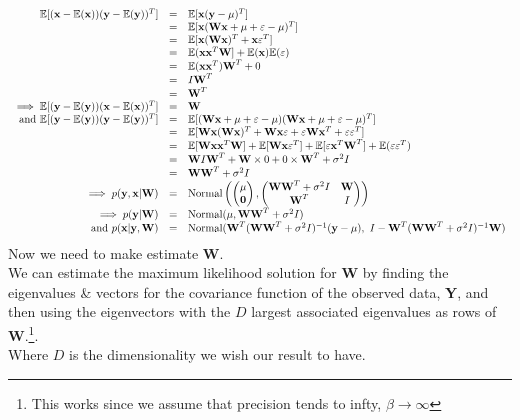 \documentclass[11pt,a4paper]{article}
\begin{document}
\[\begin{array}{rcl}
\expect[(\textbf{x}-\expect(\textbf{x}))(\textbf{y}-\expect(\textbf{y}))^T]&=&\expect[\x(\textbf{y}-\mu)^T]\\
&=&\expect[\x(\textbf{W}\x+\mu+\varepsilon-\mu)^T]\\
&=&\expect[\x(\textbf{W}\x)^T+\x\varepsilon^T]\\
&=&\expect(\x\x^T\textbf{W}]+\expect(\x)\expect(\varepsilon)\\
&=&\expect(\x\x^T)\textbf{W}^T+0\\
&=&I\textbf{W}^T\\
&=&\textbf{W}^T\\
\implies\expect[(\textbf{y}-\expect(\textbf{y}))(\textbf{x}-\expect(\textbf{x}))^T]&=&\textbf{W}\\
\text{and }\expect[(\textbf{y}-\expect(\textbf{y}))(\textbf{y}-\expect(\textbf{y}))^T]&=&\expect[(\textbf{W}\x+\mu+\varepsilon-\mu)(\textbf{W}\x+\mu+\varepsilon-\mu)^T]\\
&=&\expect[\textbf{W}\x(\textbf{W}\x)^T+\textbf{W}\x\varepsilon+\varepsilon\textbf{W}\x^T+\varepsilon\varepsilon^T]\\
&=&\expect[\textbf{W}\x\x^T\textbf{W}]+\expect[\textbf{W}\x\varepsilon^T]+\expect[\varepsilon\x^T\textbf{W}^T]+\expect(\varepsilon\varepsilon^T)\\
&=&\textbf{W}I\textbf{W}^T+\textbf{W}\times0+0\times\textbf{W}^T+\sigma^2 I\\
&=&\textbf{W}\textbf{W}^T+\sigma^2I\\
\implies p(\textbf{y},\x|\textbf{W})&=&\text{Normal}\left(\begin{pmatrix}\mu\\\textbf{0}\end{pmatrix},\begin{pmatrix}\textbf{W}\textbf{W}^T+\sigma^2I&\textbf{W}\\\textbf{W}^T&I\end{pmatrix}\right)\\
\implies p(\textbf{y}|\textbf{W})&=&\text{Normal}(\mu,\textbf{W}\textbf{W}^T+\sigma^2I)\\
\text{and }p(\x|\textbf{y},\textbf{W})&=&\text{Normal}(\textbf{W}^T(\textbf{W}\textbf{W}^T+\sigma^2I)^{-1}(\textbf{y}-\mu),\ I-\textbf{W}^T(\textbf{W}\textbf{W}^T+\sigma^2I)^{-1}\textbf{W})\\
\end{array}\]
Now we need to make estimate \textbf{W}.\\
We can estimate the maximum likelihood solution for \textbf{W} by finding the eigenvalues \& vectors for the covariance function of the observed data, \textbf{Y}, and then using the eigenvectors with the $D$ largest associated eigenvalues as rows of \textbf{W}.\footnote{This works since we assume that precision tends to infty, $\beta\to\infty$}.\\
Where $D$ is the dimensionality we wish our result to have.
\end{document}

